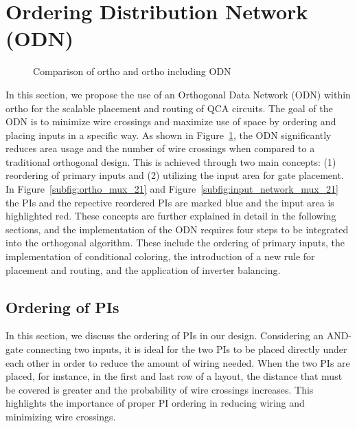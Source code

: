 \section{Ordering Distribution Network (ODN)}

\begin{figure}
	\centering
	\caption{Comparison of ortho and ortho including ODN}\label{fig:input_network_mux_21}
\end{figure}


In this section, we propose the use of an Orthogonal Data Network (ODN) within ortho for the scalable placement and routing of QCA circuits. The goal of the ODN is to minimize wire crossings and maximize use of space by ordering and placing inputs in a specific way. As shown in Figure~\ref{fig:input_network_mux_21}, the ODN significantly reduces area usage and the number of wire crossings when compared to a traditional orthogonal design. This is achieved through two main concepts: (1) reordering of primary inputs and (2) utilizing the input area for gate placement. In Figure~\ref{subfig:ortho_mux_21} and Figure~\ref{subfig:input_network_mux_21} the PIs and the repective reordered PIs are marked blue and the input area is highlighted red. These concepts are further explained in detail in the following sections, and the implementation of the ODN requires four steps to be integrated into the orthogonal algorithm. These include the ordering of primary inputs, the implementation of conditional coloring, the introduction of a new rule for placement and routing, and the application of inverter balancing.

\subsection{Ordering of PIs}

In this section, we discuss the ordering of PIs in our design. Considering an AND-gate connecting two inputs, it is ideal for the two PIs to be placed directly under each other in order to reduce the amount of wiring needed. When the two PIs are placed, for instance, in the first and last row of a layout, the distance that must be covered is greater and the probability of wire crossings increases. This highlights the importance of proper PI ordering in reducing wiring and minimizing wire crossings.

